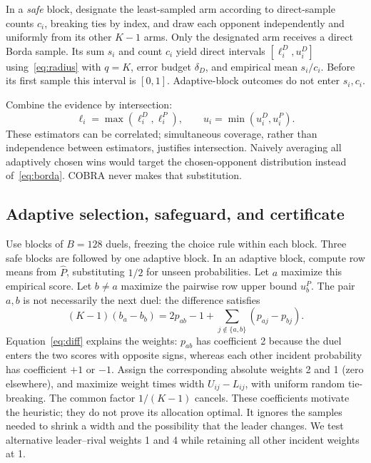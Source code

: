 \documentclass[11pt,a4paper]{article}
\begin{document}
In a \emph{safe} block, designate the least-sampled arm according to direct-sample counts $c_i$, breaking ties by index, and draw each opponent independently and uniformly from its other $K-1$ arms. Only the designated arm receives a direct Borda sample. Its sum $s_i$ and count $c_i$ yield direct intervals $[\ell_i^D,u_i^D]$ using~\eqref{eq:radius} with $q=K$, error budget $\delta_D$, and empirical mean $s_i/c_i$. Before its first sample this interval is $[0,1]$. Adaptive-block outcomes do not enter $s_i,c_i$.

Combine the evidence by intersection:
\begin{equation}\label{eq:intersection}
\ell_i=\max(\ell_i^D,\ell_i^P),\qquad u_i=\min(u_i^D,u_i^P).
\end{equation}
These estimators can be correlated; simultaneous coverage, rather than independence between estimators, justifies intersection. Naively averaging all adaptively chosen wins would target the chosen-opponent distribution instead of~\eqref{eq:borda}. COBRA never makes that substitution.

\subsection{Adaptive selection, safeguard, and certificate}
Use blocks of $B=128$ duels, freezing the choice rule within each block. Three safe blocks are followed by one adaptive block. In an adaptive block, compute row means from $\hat P$, substituting $1/2$ for unseen probabilities. Let $a$ maximize this empirical score. Let $b\ne a$ maximize the pairwise row upper bound $u_b^P$. The pair $a,b$ is not necessarily the next duel: the difference satisfies
\begin{equation}\label{eq:diff}
(K-1)(b_a-b_b)=2p_{ab}-1+\sum_{j\notin\{a,b\}}(p_{aj}-p_{bj}).
\end{equation}
Equation~\eqref{eq:diff} explains the weights: $p_{ab}$ has coefficient 2 because the duel enters the two scores with opposite signs, whereas each other incident probability has coefficient $+1$ or $-1$. Assign the corresponding absolute weights 2 and 1 (zero elsewhere), and maximize weight times width $U_{ij}-L_{ij}$, with uniform random tie-breaking. The common factor $1/(K-1)$ cancels. These coefficients motivate the heuristic; they do not prove its allocation optimal. It ignores the samples needed to shrink a width and the possibility that the leader changes. We test alternative leader--rival weights 1 and 4 while retaining all other incident weights at 1.
\end{document}
